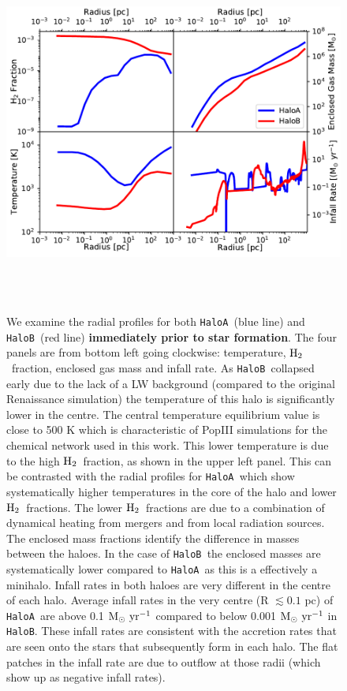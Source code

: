 \documentclass[twocolumn,iop,revtex4]{openjournal}
\newcommand{\msolaryr} {$\rm{M_{\odot}~yr^{-1}}~$}
\newcommand{\molH} {$\rm{H_2}$~}
\newcommand{\ha} {\texttt{HaloA~}}
\newcommand{\hb} {\texttt{HaloB~}}
\newcommand{\hbc} {\texttt{HaloB}}
\begin{document}
\begin{figure}
\centering
\begin{minipage}{175mm}      \begin{center}
\centerline{
    \includegraphics[width=18.0cm, height=12cm]{FIGURES/MultiPlot.pdf}}
\caption{We examine the radial profiles for both \ha (blue line) and \hb (red line) \textbf{immediately prior to star formation}. The four panels
  are from bottom left going clockwise: temperature, \molH fraction, enclosed gas mass and infall rate.
  As \hb collapsed early due to the lack of a LW background (compared to the original Renaissance simulation)
  the temperature of this halo is significantly lower in the centre. The central temperature equilibrium
  value is close to 500 K which is characteristic of PopIII simulations for the chemical network used in this work.
  This lower temperature is due to the high \molH fraction, as shown in the upper left panel. This can
  be contrasted with the radial profiles for \ha which show systematically higher temperatures in the core of the
  halo and lower \molH fractions. The lower \molH fractions are due to a combination of dynamical heating from
  mergers and from local radiation sources. The enclosed mass fractions identify the difference
  in masses between the haloes. In the case of \hb the enclosed masses are systematically lower compared
  to \ha as this is a effectively a minihalo. Infall rates in both haloes are very different in the
  centre of each halo. Average infall rates in the very centre (R $\lesssim 0.1$ pc) of \ha are
  above 0.1 \msolaryr compared to below 0.001 \msolaryr in \hbc. These infall rates are consistent
  with the accretion rates that are seen onto the stars that subsequently form in each halo. The flat
  patches in the infall rate are due to outflow at those radii
  (which show up as negative infall rates). }
\label{Fig:RadialProfiles}
\end{center} \end{minipage}
\end{figure}
\end{document}
